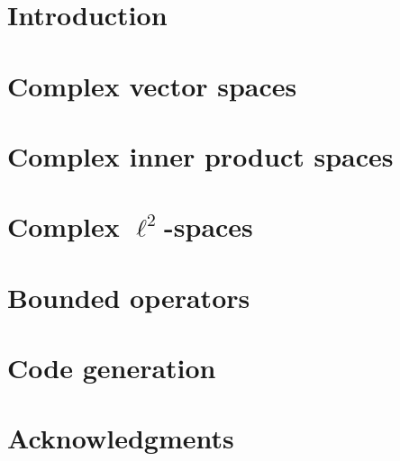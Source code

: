 \documentclass[12pt]{article}
\theoremstyle{definition}
\begin{document}
\maketitle

\begin{abstract}
\blindtext[1]
\end{abstract}

\section{Introduction}
\cite{unruh2019quantum}

\blindtext[4]

\section{Complex vector spaces}
\blindtext[6]

\section{Complex inner product spaces}
\blindtext[6]

\section{Complex $\ell^2$-spaces}
\blindtext[6]

\section{Bounded operators}
\blindtext[6]

\section{Code generation}
\blindtext[6]

\section*{Acknowledgments}
\blindtext[1]




\end{document}
